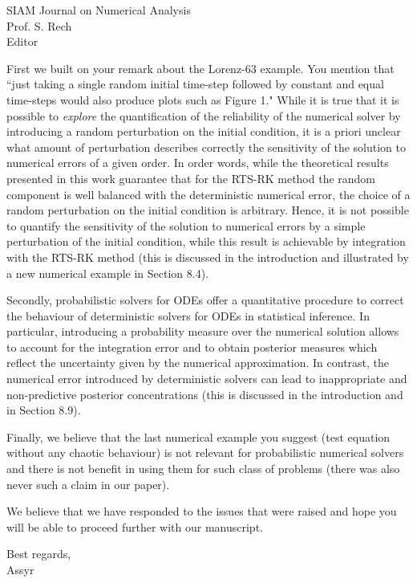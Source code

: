 \documentclass[10pt]{letter}
\begin{document}
\begin{letter}{SIAM Journal on Numerical Analysis\\
               Prof. S. Rech\\
	   Editor\\
\vspace{0,5cm}
}
\begin{itemize}
First we built on your remark about the Lorenz-63 example. You mention that ``just taking a single random initial time-step followed by constant and equal time-steps would also produce plots such as Figure 1." While it is true that it is possible to {\it explore} the quantification of the reliability of the numerical solver by introducing a random perturbation on the initial condition, it is a priori unclear what amount of perturbation describes correctly  the sensitivity of the solution to numerical errors of a given order. In order words, while the theoretical results presented in this work guarantee that for the RTS-RK method the random component is well balanced with the deterministic numerical error, the choice of a random perturbation on the initial condition is arbitrary. Hence, it is not possible to quantify the sensitivity of the solution to numerical errors by a simple perturbation of the initial condition, while this result is achievable by integration with the RTS-RK method (this is discussed in the introduction and illustrated by a new numerical example in Section 8.4).

Secondly, probabilistic solvers for ODEs offer a quantitative procedure to correct the behaviour of deterministic solvers for ODEs in statistical inference. In particular, introducing a probability measure over the numerical solution allows to account for the integration error and to obtain posterior measures which reflect the uncertainty given by the numerical approximation. In contrast, the numerical error introduced by deterministic solvers can lead to inappropriate and non-predictive posterior concentrations (this is discussed in the introduction and in Section 8.9).

Finally, we believe that  the last numerical example you suggest (test equation without any chaotic behaviour) is not relevant for probabilistic numerical solvers and there is not benefit in using them for such class of problems (there was also never such a claim in our paper). 

\end{itemize}

We believe that we have responded to the issues that were raised and hope you will be able to proceed further with our manuscript.


\vspace{0.25cm}

\closing{Best regards,\\ \vspace{1.5cm} Assyr}

\end{letter}
\end{document}
